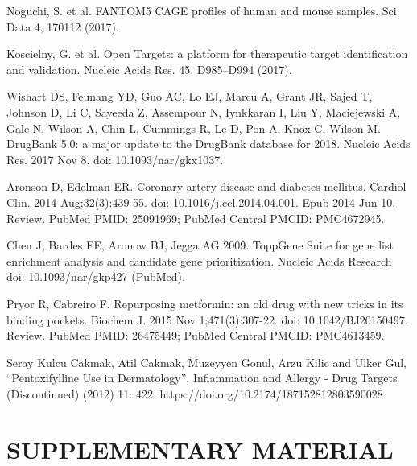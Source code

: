 \documentclass[fleqn,10pt]{SelfArx} %
\begin{document}
\begin{thebibliography}{1}
	 Noguchi, S. et al. FANTOM5 CAGE profiles of human and mouse samples. Sci Data 4, 170112 (2017).
	
	 Koscielny, G. et al. Open Targets: a platform for therapeutic target identification and validation. Nucleic Acids Res. 45, D985–D994 (2017).
	
	 Wishart DS, Feunang YD, Guo AC, Lo EJ, Marcu A, Grant JR, Sajed T, Johnson D, Li C, Sayeeda Z, Assempour N, Iynkkaran I, Liu Y, Maciejewski A, Gale N, Wilson A, Chin L, Cummings R, Le D, Pon A, Knox C, Wilson M. DrugBank 5.0: a major update to the DrugBank database for 2018. Nucleic Acids Res. 2017 Nov 8. doi: 10.1093/nar/gkx1037.
	
	 Aronson D, Edelman ER. Coronary artery disease and diabetes mellitus. Cardiol Clin. 2014 Aug;32(3):439-55. doi: 10.1016/j.ccl.2014.04.001. Epub 2014 Jun 10. Review. PubMed PMID: 25091969; PubMed Central PMCID: PMC4672945.
	
	 Chen J, Bardes EE, Aronow BJ, Jegga AG 2009. ToppGene Suite for gene list enrichment analysis and candidate gene prioritization. Nucleic Acids Research
	doi: 10.1093/nar/gkp427 (PubMed).
	
	 Pryor R, Cabreiro F. Repurposing metformin: an old drug with new tricks in its binding pockets. Biochem J. 2015 Nov 1;471(3):307-22. doi: 10.1042/BJ20150497. Review. PubMed PMID: 26475449; PubMed Central PMCID: PMC4613459.
	
	 Seray Kulcu Cakmak, Atil Cakmak, Muzeyyen Gonul, Arzu Kilic and Ulker Gul, “Pentoxifylline Use in Dermatology”, Inflammation and Allergy - Drug Targets (Discontinued) (2012) 11: 422. https://doi.org/10.2174/187152812803590028
	
	
\end{thebibliography}


\pagebreak
\onecolumn

\section*{SUPPLEMENTARY MATERIAL}

\end{document}

